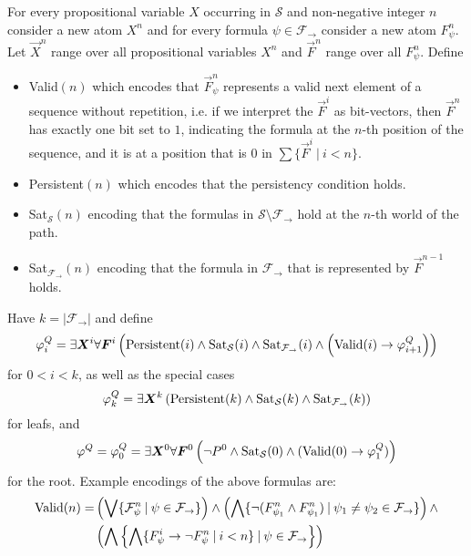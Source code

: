 \documentclass[runningheads]{llncs}
\begin{document}
\begin{definition}
	For every propositional variable $X$ occurring in $\mathcal S$ and non-negative integer $n$ consider a new atom $X^n$ and for every formula $\psi\in\mathcal F_\to$ consider a new atom $F_\psi^n$. Let $\vec X^n$ range over all propositional variables $X^n$ and $\vec F^n$ range over all $F_\psi^n$. Define
	\begin{itemize}
		\item {\normalfont Valid}$(n)$ which encodes that $\vec F^n_\psi$ represents a valid next element of a sequence without repetition, i.e. if we interpret the $\vec F^i$ as bit-vectors, then $\vec F^n$ has exactly one bit set to $1$, indicating the formula at the $n$-th position of the sequence, and it is at a position that is $0$ in $\sum\{\vec F^i\:|\:i < n\}$.
		\item {\normalfont Persistent}$(n)$ which encodes that the persistency condition holds.
		\item {\normalfont Sat}$_{\mathcal S}(n)$ encoding that the formulas in $\mathcal S\setminus\mathcal F_\to$ hold at the $n$-th world of the path.
		\item {\normalfont Sat}$_{\mathcal F_\to}(n)$ encoding that the formula in $\mathcal F_\to$ that is represented by $\vec F^{n-1}$ holds.
	\end{itemize}
	Have $k = |\mathcal F_\to|$ and define$$\varphi^Q_{i} = \exists \vec X^i\forall \vec F^i\left(\text{\normalfont Persistent}(i)\wedge \text{\normalfont Sat}_{\mathcal S}(i)\wedge \text{\normalfont Sat}_{\mathcal F_\to}(i)\wedge\left(\text{\normalfont Valid}(i)\to \varphi^Q_{i+1}\right)\right)$$
	for $0 < i < k$, as well as the special cases
	$$\varphi^Q_{k} = \exists \vec X^k\left(\text{\normalfont Persistent}(k)\wedge \text{\normalfont Sat}_{\mathcal S}(k)\wedge \text{\normalfont Sat}_{\mathcal F_\to}(k)\right)$$
	for leafs, and $$\varphi^Q = \varphi_0^Q = \exists \vec X^0\forall \vec F^0\left(\neg P^0\wedge \text{\normalfont Sat}_{\mathcal S}(0)\wedge(\text{\normalfont Valid}(0)\to \varphi_1^Q)\right)$$for the root.
	Example encodings of the above formulas are:
	\begin{align*}
		\text{\normalfont Valid}(n) = &\left(\bigvee \{\mathcal F^n_\psi\:|\:\psi\in\mathcal F_\to\}\right)\wedge\left(\bigwedge \{\neg(F^n_{\psi_1}\wedge F^n_{\psi_1})\:|\:\psi_1\neq\psi_2\in\mathcal F_\to\}\right)\wedge\\&\left(\bigwedge\left\{\bigwedge\{F^i_\psi\to\neg F^n_\psi\:|\:i < n\}\:|\:\psi\in\mathcal F_\to\right\}\right)\\

\end{align*}
\end{definition}
\end{document}
